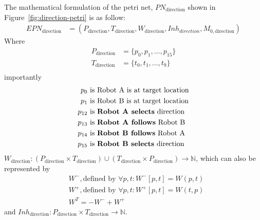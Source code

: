 \documentclass[12pt,a4paper]{article}
\begin{document}
The mathematical formulation of the petri net, $PN_{\text{direction}}$ shown in Figure~\ref{fig:direction-petri} is as follow:
\begin{align*}
    EPN_{\text{direction}} &= (P_{\text{direction}}, T_{\text{direction}}, W_{\text{direction}}, Inh_{direction}, M_{0, \text{direction}})
\end{align*}
Where
\begin{align*}
    P_{\text{direction}} &= \{p_0, p_1, \ldots, p_{15}\} \\
    T_{\text{direction}} &= \{t_0, t_1, \ldots, t_{9}\} \\
\end{align*}
importantly
\begin{align*}
    p_0 &\text{ is Robot A is at target location} \\
    p_1 &\text{ is Robot B is at target location} \\
    p_{12} &\text{ is \textbf{Robot A selects} direction} \\
    p_{13} &\text{ is \textbf{Robot A follows} Robot B} \\
    p_{14} &\text{ is \textbf{Robot B follows} Robot A} \\
    p_{15} &\text{ is \textbf{Robot B selects} direction} \\
\end{align*}
${\displaystyle W_{\text{direction}}:(P_{\text{direction}}\times T_{\text{direction}})\cup (T_{\text{direction}}\times P_{\text{direction}})\to \mathbb {N} }$, which can also be represented by
\begin{align*}
    &W^{-}, \text{defined by } \forall p,t : W^{-}[p,t] = W(p, t) \\
    &W^{+}, \text{defined by } \forall p,t : W^{+}[p,t] = W(t, p) \\
    &W^{T} = -W^{-} + W^{+}
\end{align*}
and ${\displaystyle Inh_{\text{direction}}:P_{\text{direction}}\times T_{\text{direction}}\to \mathbb {N} }$.
\end{document}
